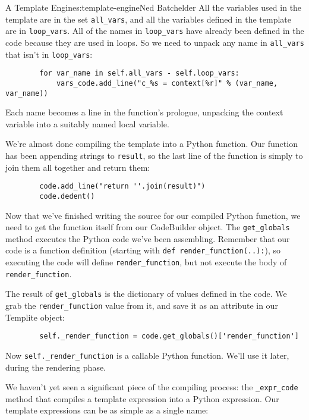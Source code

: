 \begin{aosachapter}{A Template Engine}{s:template-engine}{Ned Batchelder}
All the variables used in the template are in the set
\texttt{all\_vars}, and all the variables defined in the template are in
\texttt{loop\_vars}. All of the names in \texttt{loop\_vars} have
already been defined in the code because they are used in loops. So we
need to unpack any name in \texttt{all\_vars} that isn't in
\texttt{loop\_vars}:

\begin{verbatim}
        for var_name in self.all_vars - self.loop_vars:
            vars_code.add_line("c_%s = context[%r]" % (var_name, var_name))
\end{verbatim}

Each name becomes a line in the function's prologue, unpacking the
context variable into a suitably named local variable.

We're almost done compiling the template into a Python function. Our
function has been appending strings to \texttt{result}, so the last line
of the function is simply to join them all together and return them:

\begin{verbatim}
        code.add_line("return ''.join(result)")
        code.dedent()
\end{verbatim}

Now that we've finished writing the source for our compiled Python
function, we need to get the function itself from our CodeBuilder
object. The \texttt{get\_globals} method executes the Python code we've
been assembling. Remember that our code is a function definition
(starting with \texttt{def render\_function(..):}), so executing the
code will define \texttt{render\_function}, but not execute the body of
\texttt{render\_function}.

The result of \texttt{get\_globals} is the dictionary of values defined
in the code. We grab the \texttt{render\_function} value from it, and
save it as an attribute in our Templite object:

\begin{verbatim}
        self._render_function = code.get_globals()['render_function']
\end{verbatim}

Now \texttt{self.\_render\_function} is a callable Python function.
We'll use it later, during the rendering phase.

\label{compiling-expressions}

We haven't yet seen a significant piece of the compiling process: the
\texttt{\_expr\_code} method that compiles a template expression into a
Python expression. Our template expressions can be as simple as a single
name:


\end{aosachapter}

